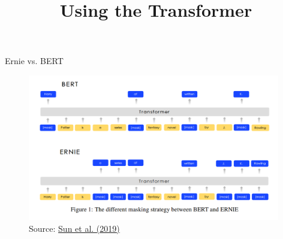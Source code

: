 



\newcommand{\titlefigure}{figure/sesamestreet.jpeg}
\newcommand{\learninggoals}{
\item Understand the differences to BERT
\item Dynamic Masking}

\title{Using the Transformer}
\date{}




\begin{frame}{Ernie vs. BERT}

\vfill

\begin{figure}
\centering
\includegraphics[width = 11cm]{figure/ernie-vs-bert.png}\\ 
\footnotesize{Source:} \href{https://arxiv.org/pdf/1907.11692.pdf}{\footnotesize Sun et al. (2019)}
\end{figure}

\vfill

\end{frame}


